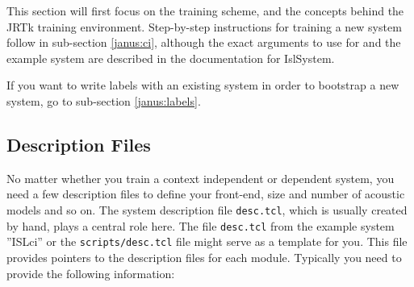 This section will first focus on the training scheme, and the concepts
behind  the JRTk training  environment. Step-by-step  instructions for
training a new system follow  in sub-section \ref{janus:ci},  although
the exact  arguments to   use   for  and   the
example system are described in the documentation for IslSystem.

If you want to write labels with an existing system in order to
bootstrap a new system, go to sub-section \ref{janus:labels}.

\subsection{Description Files}

No matter whether you train a context independent or dependent system,
you need a  few description files to define  your  front-end, size and
number of  acoustic  models and  so  on.  The system  description file
\texttt{desc.tcl},  which is usually created  by hand, plays a central
role here.   The  file  \texttt{desc.tcl}   from the  example   system
''ISLci'' or  the   \texttt{scripts/desc.tcl} file might  serve   as a
template for you.    This  file provides pointers  to  the description
files  for  each module. Typically  you need  to provide the following
information:

